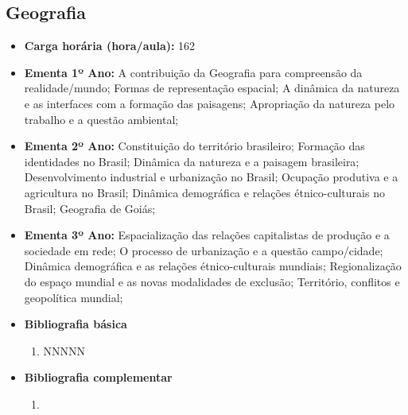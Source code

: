 \documentclass[11pt,fleqn]{book} %
\begin{document}
\subsection{Geografia}\label{disc:geografia}
\begin{itemize}
	\item \textbf{Carga horária (hora/aula):} 162
	\item \textbf{Ementa 1º Ano:} 
	A contribuição da Geografia para compreensão da realidade/mundo;
	Formas de representação espacial;
	A dinâmica da natureza e as interfaces com a formação das paisagens;
	Apropriação da natureza pelo trabalho e a questão ambiental;
	\item \textbf{Ementa 2º Ano:} 	
	Constituição do território brasileiro;
	Formação das identidades no Brasil; 
	Dinâmica da natureza e a paisagem brasileira;
	Desenvolvimento industrial e urbanização no Brasil;
	Ocupação produtiva e a agricultura no Brasil; 
	Dinâmica demográfica e relações étnico-culturais no Brasil;
	Geografia de Goiás;
	\item \textbf{Ementa 3º Ano:} 	
	Espacialização das relações capitalistas de produção e a sociedade em rede;
	O processo de urbanização e a questão campo/cidade;
	Dinâmica demográfica e as relações étnico-culturais mundiais;
	Regionalização do espaço mundial e as novas modalidades de exclusão;
	Território, conflitos e geopolítica mundial;
	\item \textbf{Bibliografia básica}
	\begin{enumerate}
		\item NNNNN
	\end{enumerate}
	\item \textbf{Bibliografia complementar}
	\begin{enumerate}
		\item 
	\end{enumerate}	
\end{itemize}

\newpage
\end{document}
